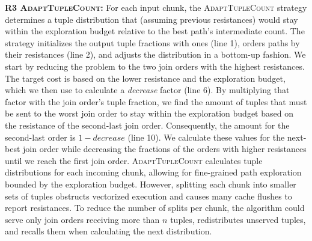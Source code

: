 \textbf{R3 \textsc{AdaptTupleCount}:} For each input chunk, the \textsc{AdaptTupleCount} strategy determines a tuple distribution that (assuming previous resistances) would stay within the exploration budget relative to the best path's intermediate count.
%
The strategy initializes the output tuple fractions with ones (line 1), orders paths by their resistances (line 2), and adjusts the distribution in a bottom-up fashion. We start by reducing the problem to the two join orders with the highest resistances. The target cost is based on the lower resistance and the exploration budget, which we then use to calculate a \textit{decrease} factor (line 6). By multiplying that factor with the join order's tuple fraction, we find the amount of tuples that must be sent to the worst join order to stay within the exploration budget based on the resistance of the second-last join order. Consequently, the amount for the second-last order is $1 - \mathit{decrease}$ (line 10). We calculate these values for the next-best join order while decreasing the fractions of the orders with higher resistances until we reach the first join order. \textsc{AdaptTupleCount} calculates tuple distributions for each incoming chunk, allowing for fine-grained path exploration bounded by the exploration budget. However, splitting each chunk into smaller sets of tuples obstructs vectorized execution and causes many cache flushes to report resistances. To reduce the number of splits per chunk, the algorithm could serve only join orders receiving more than $n$ tuples, redistributes unserved tuples, and recalls them when calculating the next distribution.


